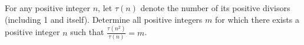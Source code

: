 For any positive integer $n$, let $\tau(n)$ denote the number of its positive divisors (including 1 and itself). Determine all positive integers $m$ for which there exists a positive integer $n$ such that $\frac{\tau(n^2)}{\tau(n)} = m$.
